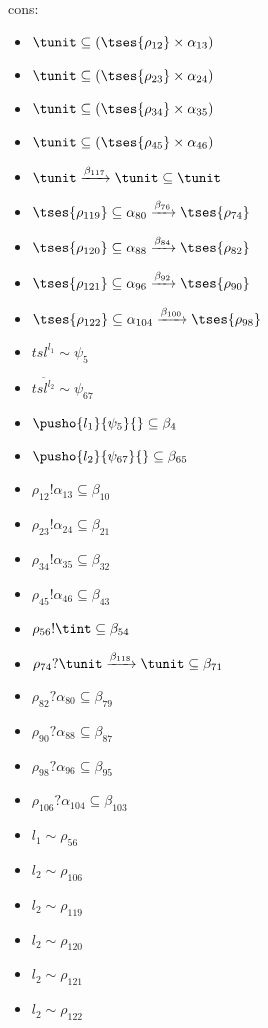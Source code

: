 \documentclass[12pt]{article}
\begin{document}
 \\ cons: \begin{itemize}
\item $ \tunit \subseteq ( \tses{ \rho_{12}} \times \alpha_{13}) $
\item $ \tunit \subseteq ( \tses{ \rho_{23}} \times \alpha_{24}) $
\item $ \tunit \subseteq ( \tses{ \rho_{34}} \times \alpha_{35}) $
\item $ \tunit \subseteq ( \tses{ \rho_{45}} \times \alpha_{46}) $
\item $ \tunit \xrightarrow{\beta_{117}} \tunit \subseteq \tunit $
\item $  \tses{ \rho_{119}} \subseteq \alpha_{80} \xrightarrow{\beta_{76}}  \tses{ \rho_{74}} $
\item $  \tses{ \rho_{120}} \subseteq \alpha_{88} \xrightarrow{\beta_{84}}  \tses{ \rho_{82}} $
\item $  \tses{ \rho_{121}} \subseteq \alpha_{96} \xrightarrow{\beta_{92}}  \tses{ \rho_{90}} $
\item $  \tses{ \rho_{122}} \subseteq \alpha_{104} \xrightarrow{\beta_{100}}  \tses{ \rho_{98}} $
\item $ {tsl}^{l_{1}} \sim\psi_{5} $
\item $ \overline{{tsl}^{l_{2}}} \sim\psi_{67} $
\item $ \pusho{ l_{1}} {\psi_{5}}{} \subseteq \beta_{4} $
\item $ \pusho{ l_{2}} {\psi_{67}}{} \subseteq \beta_{65} $
\item $ \rho_{12}!\alpha_{13} \subseteq \beta_{10} $
\item $ \rho_{23}!\alpha_{24} \subseteq \beta_{21} $
\item $ \rho_{34}!\alpha_{35} \subseteq \beta_{32} $
\item $ \rho_{45}!\alpha_{46} \subseteq \beta_{43} $
\item $ \rho_{56}!\tint \subseteq \beta_{54} $
\item $ \rho_{74}?\tunit \xrightarrow{\beta_{118}} \tunit \subseteq \beta_{71} $
\item $ \rho_{82}?\alpha_{80} \subseteq \beta_{79} $
\item $ \rho_{90}?\alpha_{88} \subseteq \beta_{87} $
\item $ \rho_{98}?\alpha_{96} \subseteq \beta_{95} $
\item $ \rho_{106}?\alpha_{104} \subseteq \beta_{103} $
\item $ l_{1} \sim\rho_{56} $
\item $ l_{2} \sim\rho_{106} $
\item $ l_{2} \sim\rho_{119} $
\item $ l_{2} \sim\rho_{120} $
\item $ l_{2} \sim\rho_{121} $
\item $ l_{2} \sim\rho_{122} $
\end{itemize}
\end{document}
